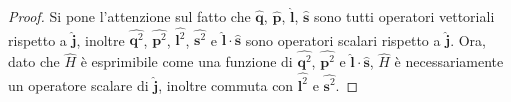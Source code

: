 \documentclass[12pt,a4paper]{report}
\numberwithin{equation}{section}
\numberwithin{section}{chapter}
\begin{document}
	\begin{proof}
	Si pone l'attenzione sul fatto che $\widehat{\boldsymbol{q}}$, $\widehat{\boldsymbol{p}}$, $\widehat{\boldsymbol{l}}$, $\widehat{\boldsymbol{s}}$ sono tutti operatori vettoriali rispetto a $\widehat{\boldsymbol{j}}$, inoltre $\widehat{\boldsymbol{q}^2}$, $\widehat{\boldsymbol{p}^2}$, $\widehat{\boldsymbol{l}^2}$, $\widehat{\boldsymbol{s}^2}$ e $\widehat{\boldsymbol{l}}\cdot\widehat{\boldsymbol{s}}$ sono operatori scalari rispetto a $\widehat{\boldsymbol{j}}$. Ora, dato che $\widehat{H}$ \`e esprimibile come una funzione di $\widehat{\boldsymbol{q}^2}$, $\widehat{\boldsymbol{p}^2}$ e $\widehat{\boldsymbol{l}}\cdot\widehat{\boldsymbol{s}}$, $\widehat{H}$ \`e necessariamente un operatore scalare di $\widehat{\boldsymbol{j}}$, inoltre commuta con $\widehat{\boldsymbol{l}^2}$ e $\widehat{\boldsymbol{s}^2}$. 
	

\end{proof}
\end{document}
